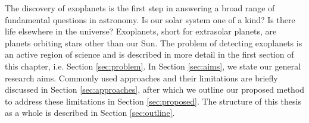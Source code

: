 

The discovery of exoplanets is the first step in answering a broad range of fundamental questions in astronomy. Is our solar system one of a kind? Is there life elsewhere in the universe? Exoplanets, short for extrasolar planets, are planets orbiting stars other than our Sun.
The problem of detecting exoplanets is an active region of science and is described in more detail in the first section of this chapter, i.e. Section \ref{sec:problem}. In Section \ref{sec:aims}, we state our general research aims. Commonly used approaches and their limitations are briefly discussed in Section \ref{sec:approaches}, after which we outline our proposed method to address these limitations in Section \ref{sec:proposed}. The structure of this thesis as a whole is described in Section \ref{sec:outline}.